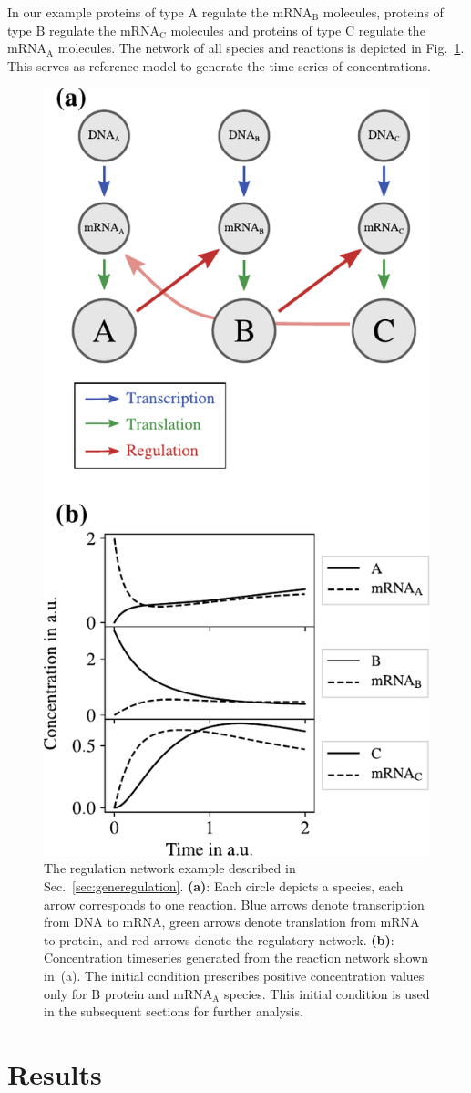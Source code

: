 \documentclass[oneside, abstracton, titlepage]{scrartcl}
\begin{document}
    In our example proteins of type $\mathrm{A}$ regulate the $\mathrm{mRNA}_\mathrm{B}$ molecules, proteins of type $\mathrm{B}$ regulate the $\mathrm{mRNA}_\mathrm{C}$ molecules and proteins of type $\mathrm{C}$ regulate the $\mathrm{mRNA}_\mathrm{A}$ molecules. The network of all species and reactions is depicted in Fig.~\ref{fig:network}. This serves as reference model to generate the time series of concentrations.
    \begin{figure}
        \centering
        \includegraphics[width=.5\textwidth]{./figures_tex/scheme.pdf}
        \caption{The regulation network example described in Sec.~\ref{sec:generegulation}. \textbf{(a)}: Each circle depicts a species, each arrow corresponds to one reaction. Blue arrows denote transcription from DNA to $\mathrm{mRNA}$, green arrows denote translation from $\mathrm{mRNA}$ to protein, and red arrows denote the regulatory network. \textbf{(b)}: Concentration timeseries generated from the reaction network shown in~(a). The initial condition prescribes positive concentration values only for $\mathrm{B}$ protein and $\mathrm{mRNA}_\mathrm{A}$ species. This initial condition is used in the subsequent sections for further analysis.}
        \label{fig:network}
    \end{figure}

	\section{Results} \label{sec:results}
	
\end{document}
